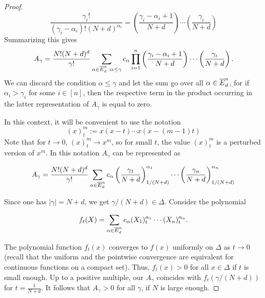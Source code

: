 \begin{proof}
	\[
		\frac{\gamma_i !}{(\gamma_i-\alpha_i)! (N+d)^{\alpha_i}} = \left(\frac{\gamma_i - \alpha_i+1}{N+d} \right) \cdots \left( \frac{\gamma_i}{N+d} \right)
	\]
	Summarizing this gives
	\[
		A_\gamma = \frac{N!(N+d)^d}{\gamma!} \sum_{\alpha \in \overline{E}^n_d \, : \alpha \le \gamma} c_\alpha \prod_{i=1}^n \left(\frac{\gamma_i - \alpha_i+1}{N+d} \right) \cdots \left( \frac{\gamma_i}{N+d} \right).
	\]
	We can discard the condition $\alpha \le \gamma$  and let the sum go over all $\alpha \in \overline{E}^n_d$, for if $\alpha_i > \gamma_i$ for some $i \in [n]$, then the respective term in the product occurring in the latter representation of $A_\gamma$ is equal to zero. 
	
	In this context, it will be convenient to use the notation
	\[
		(x)_t^m := x (x-t) \cdots x (x - (m-1) t)
	\]
	Note that for $t \to 0$, $(x)_t^m \to x^m$, so for small $t$, the value $(x)_t^m$ is a perturbed version of $x^m$. In this notation $A_\gamma$ can be represented as
	
	\[
		A_\gamma = \frac{N!(N+d)^d}{\gamma!} \sum_{\alpha \in \overline{E}^n_d} c_\alpha \left(\frac{\gamma_1}{N+d} \right)_{1/(N+d)}^{\alpha_1} \cdots  \left(\frac{\gamma_n}{N+d} \right)_{1/(N+d)}^{\alpha_n}
	\]
	
	Since one has $|\gamma|= N+d$, we get $\gamma / (N+d) \in \Delta$. Consider the polynomial
	
	\[
		f_t(X) = \sum_{\alpha \in \overline{E}^n_d} c_\alpha (X_1)_t^{\alpha_1} \cdots (X_n)_t^{\alpha_n}.
	\]
	
	The polynomial function $f_t(x)$ converges to $f(x)$ uniformly on $\Delta$ as $t \rightarrow 0$ (recall that the uniform and the pointwise convergence are equivalent for continuous functions on a compact set). Thus, $f_t(x)>0$ for all $x \in \Delta$ if $t$ is small enough. Up to a positive multiple, our $A_\gamma$ coincides with $f_t(\gamma/ (N+d))$ for $t=\frac{1}{N+d}$. It follows that $A_\gamma  > 0$ for all $\gamma$, if $N$ is large enough. 
\end{proof}

